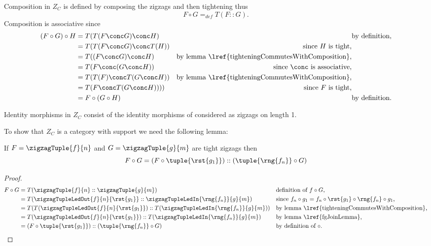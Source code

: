 Composition in $Z_C$ is defined by composing the zigzags and then tightening  thus
\[
F \circ G =_{def} T(F :: G).
\]
Composition is associative since 
\begin{align*}
(F \circ G) \circ H 
                &= T(T(F \conc G) \conc H) &&   \mbox{by definition,} \\
                &= T(T(F \conc G) \conc T(H))
                        &\mbox{since $H$ is tight,}\\
                &= T((F \conc G) \conc H)  
                        &\mbox{by lemma \lref{tighteningCommutesWithComposition},}\\
                &= T(F \conc (G \conc H))
                        &\mbox {since $\conc$ is associative,} \\
                &= T(T(F) \conc T(G \conc H))       
                        &\mbox{by lemma \lref{tighteningCommutesWithComposition},}\\
                &= T(F \conc T(G \conc H))))
                        &\mbox{since $F$ is tight,} \\
                &= F \circ (G \circ H) &&   \mbox{by definition.}                 
\end{align*}

Identity morphisms in $Z_C$ consist of the identity morphisms of \catcw considered 
as zigzags on length 1.

\begin{worktt}

To show that $Z_C$ is a category with support we need the following lemma:
\begin{lemma}
If $F=\zigzagTuple{f}{n}$ and $G=\zigzagTuple{g}{m}$ are tight zigzags
then 
\[
F \circ G = (F \circ \tuple{\rst{g_1}}) :: (\tuple{\rng{f_n}} \circ G)
\]
\end{lemma}
\begin{proof}
\begin{align*}
F \circ G &= T(\zigzagTuple{f}{n}::\zigzagTuple{g}{m})
           &&\mbox{definition of $f \circ G$,}\\
          &= T(\zigzagTupleLedOut{f}{n}{\rst{g_1}} :: \zigzagTupleLedIn{\rng{f_n}}{g}{m} )
          && \mbox{since $f_n \circ g_1 = f_n \circ \rst{g_1} \circ \rng{f_n} \circ g_1$,} \\
          &=  T(T(\zigzagTupleLedOut{f}{n}{\rst{g_1}}) :: 
                           T(\zigzagTupleLedIn{\rng{f_n}}{g}{m}) )
          && \mbox{by lemma \lref{tighteningCommutesWithComposition},}\\
          &= T(\zigzagTupleLedOut{f}{n}{\rst{g_1}}) :: 
                           T(\zigzagTupleLedIn{\rng{f_n}}{g}{m}) 
          && \mbox{by lemma \lref{fgJoinLemma},}\\
          &= (F \circ \tuple{\rst{g_1}}) :: (\tuple{\rng{f_n}} \circ G)
          && \mbox{by definition of $\circ$.}
\end{align*}
\end{proof}
\end{worktt}


